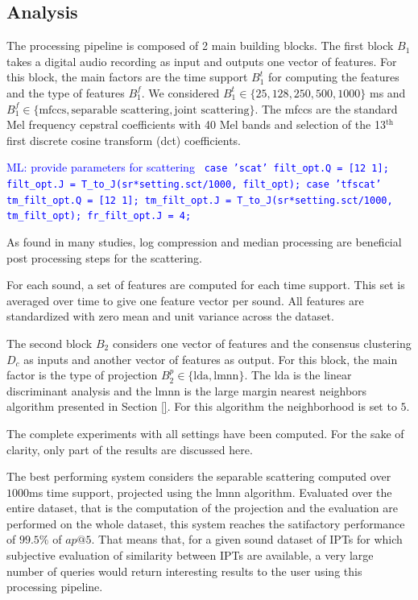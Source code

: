 \documentclass{bmcart}
\newcommand{\ipts}{IPTs\xspace}
\newcommand{\ml}[1]{\textcolor{blue}{ML: #1}}
\begin{document}
\subsection*{Analysis}

The processing pipeline is composed of 2 main building blocks. The first block $B_1$ takes a digital audio recording as input and outputs one vector of features. For this block, the main factors are the time support $B_1^t$ for computing the features and the type of features $B_1^f$. We considered $B_1^t \in \{ 25, 128, 250, 500, 1000 \}$ ms and $B_1^f \in \{ \text{mfccs}, \text{separable scattering}, \text{joint scattering} \}$. The mfccs are the standard Mel frequency cepstral coefficients with 40 Mel bands and selection of the 13$^\text{th}$ first discrete cosine transform (dct) coefficients.

\ml{provide parameters for scattering
\texttt{
case 'scat'
    filt\_opt.Q = [12 1];
    filt\_opt.J = T\_to\_J(sr*setting.sct/1000, filt\_opt);
case 'tfscat'
    tm\_filt\_opt.Q = [12 1];
    tm\_filt\_opt.J = T\_to\_J(sr*setting.sct/1000, tm\_filt\_opt);
    fr\_filt\_opt.J = 4;}}

As found in many studies, log compression and median processing are beneficial post processing steps for the scattering.

For each sound, a set of features are computed for each time support. This set is averaged over time to give one feature vector per sound.
All features are standardized with zero mean and unit variance across the dataset.

The second block $B_2$ considers one vector of features and the consensus clustering $D_c$ as inputs and another vector of features as output. For this block, the main factor is the type of projection $B_2^p \in \{ \text{lda}, \text{lmnn} \}$. The lda is the linear discriminant analysis \cite{} and the lmnn is the large margin nearest neighbors algorithm presented in Section \ref{}. For this algorithm the neighborhood is set to $5$.

The complete experiments with all settings have been computed. For the sake of clarity, only part of the results are discussed here.

The best performing system considers the separable scattering computed over $1000$ms time support, projected using the lmnn algorithm. Evaluated over the entire dataset, that is the computation of the projection and the evaluation are performed on the whole dataset, this system reaches the satifactory performance of $99.5\%$ of $ap@5$. That means that, for a given sound dataset of \ipts for which subjective evaluation of similarity between \ipts are available, a very large number of queries would return interesting results to the user using this processing pipeline.
\end{document}
